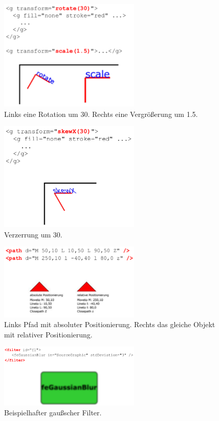 \begin{figure}[h!]\centering
\includegraphics[width=0.6\textwidth]{pictures/rot_scal.png}
\caption{Links eine Rotation um 30. Rechts eine Vergrößerung um 1.5.}
\label{fig:rot}\end{figure}
\begin{figure}[h!]\centering
\includegraphics[width=0.6\textwidth]{pictures/skew.png}
\caption{Verzerrung um 30.}
\label{fig:skew}\end{figure}
\begin{figure}[h!]\centering
\includegraphics[width=0.6\textwidth]{pictures/path.png}
\caption{Links Pfad mit absoluter Positionierung. Rechts das gleiche Objekt mit relativer Positionierung.}
\label{fig:path}\end{figure}
\begin{figure}[h!]\centering
\includegraphics[width=0.6\textwidth]{pictures/filter.png}
\caption{Beispielhafter gaußscher Filter.}
\label{fig:filter}\end{figure}
